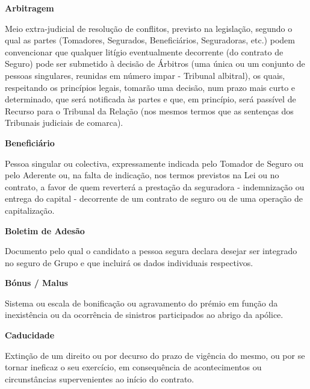 \begin{description}
\item \textbf{Arbitragem}

Meio extra-judicial de resolução de conflitos, previsto na legislação, segundo o qual as partes (Tomadores, Segurados, Beneficiários, Seguradoras, etc.) podem convencionar que qualquer litígio eventualmente decorrente (do contrato de Seguro) pode ser submetido à decisão de Árbitros (uma única ou um conjunto de pessoas singulares, reunidas em número impar - Tribunal albitral), os quais, respeitando os princípios legais, tomarão uma decisão, num prazo mais curto e determinado, que será notificada às partes e que, em princípio, será passível de Recurso para o Tribunal da Relação (nos mesmos termos que as sentenças dos Tribunais judiciais de comarca).
\end{description}

\begin{description}
\item \textbf{Beneficiário}

Pessoa singular ou colectiva, expressamente indicada pelo Tomador de Seguro ou pelo Aderente ou, na falta de indicação, nos termos previstos na Lei ou no contrato, a favor de quem reverterá a prestação da seguradora - indemnização ou entrega do capital - decorrente de um contrato de seguro ou de uma operação de capitalização.
\end{description}

\begin{description}
\item \textbf{Boletim de Adesão}

Documento pelo qual o candidato a pessoa segura declara desejar ser integrado no seguro de Grupo e que incluirá os dados individuais respectivos.
\end{description}

\begin{description}
\item \textbf{Bónus / Malus}

Sistema ou escala de bonificação ou agravamento do prémio em função da inexistência ou da ocorrência de sinistros participados ao abrigo da apólice.
\end{description}

\begin{description}
\item \textbf{Caducidade}

Extinção de um direito ou por decurso do prazo de vigência do mesmo, ou por se tornar ineficaz o seu exercício, em consequência de acontecimentos ou circunstâncias supervenientes ao início do contrato.
\end{description}

